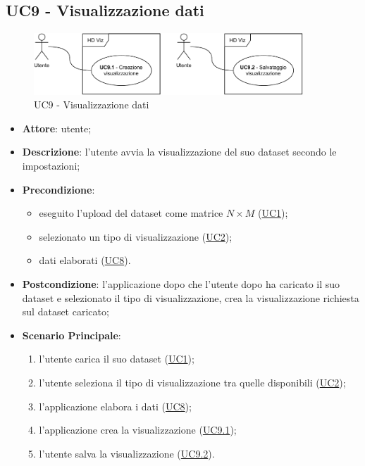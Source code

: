 \subsection{UC9 - Visualizzazione dati}
    \label{uc9}
    
    \begin{figure}[htbp]
        \centering
        \includegraphics[width=0.9\textwidth]{source/sections/casi-uso/diagrams/uc9.pdf}
        \caption{UC9 - Visualizzazione dati}
        \label{fig:uc9}
    \end{figure}
    
    \begin{itemize}
    \item \textbf{Attore}: utente;
    \item \textbf{Descrizione}: l'utente avvia la visualizzazione del suo dataset secondo le impostazioni;
    \item \textbf{Precondizione}: 
    \begin{itemize}
        \item eseguito l'upload del dataset come matrice $N\times M$ (\hyperref[uc1]{UC1});
        \item selezionato un tipo di visualizzazione (\hyperref[uc2]{UC2});
        \item dati elaborati (\hyperref[uc8]{UC8}).
    \end{itemize}  
    \item \textbf{Postcondizione}: l'applicazione dopo che l'utente dopo ha caricato il suo dataset e selezionato il tipo di visualizzazione, crea la visualizzazione richiesta sul dataset caricato;
    \item \textbf{Scenario Principale}: 
    \begin{enumerate}
        \item l'utente carica il suo dataset (\hyperref[uc1]{UC1});
        \item l'utente seleziona il tipo di visualizzazione tra quelle disponibili (\hyperref[uc2]{UC2});
        \item l'applicazione elabora i dati (\hyperref[uc8]{UC8});
        \item l'applicazione crea la visualizzazione (\hyperref[uc9.1]{UC9.1});
        \item l'utente salva la visualizzazione (\hyperref[uc9.2]{UC9.2}).
    \end{enumerate}
    \end{itemize}
    
